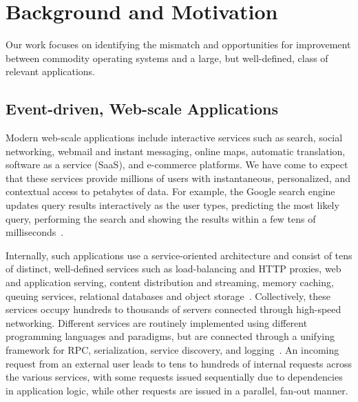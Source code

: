 
\section{Background and Motivation}
\label{sec:motivation}

Our work focuses on identifying the mismatch and opportunities for
improvement between commodity operating systems and a large, but
well-defined, class of relevant applications.

\subsection{Event-driven, Web-scale Applications}
\label{sec:motivation:web}

Modern web-scale applications include interactive services such as
search, social networking, webmail and instant messaging, online maps,
automatic translation, software as a service (SaaS), and e-commerce
platforms.  We have come to expect that these services provide
millions of users with instantaneous, personalized, and contextual
access to petabytes of data.  For example, the Google search engine
updates query results interactively as the user types, predicting the
most likely query, performing the search and showing the results
within a few tens of milliseconds~\cite{DBLP:journals/cacm/DeanB13}.

Internally, such applications use a service-oriented architecture and
consist of tens of distinct, well-defined services such as
load-balancing and HTTP proxies, web and application serving, content
distribution and streaming, memory caching, queuing services,
relational databases and object
storage~\cite{DBLP:conf/sosp/DeCandiaHJKLPSVV07,Alonso:2010:WSC,Eriksen:2013:YSF}. 
Collectively, these services occupy
hundreds to thousands of servers connected through high-speed
networking. Different services are routinely implemented using
different programming languages and paradigms, but are connected
through a unifying framework for RPC, serialization, service
discovery, and logging~\cite{protocolbuffers, thrift, fingale,
  others}. An incoming request from an external user leads to tens to
hundreds of internal requests across the various services, with some
requests issued sequentially due to dependencies in application logic,
while other requests are issued in a parallel, fan-out manner.

